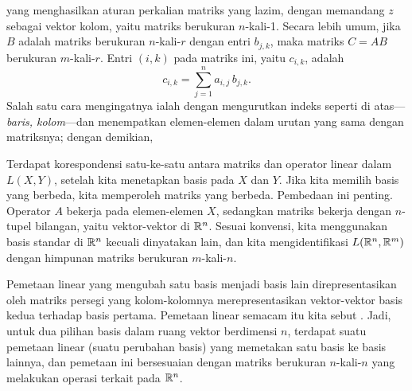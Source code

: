 yang menghasilkan aturan perkalian matriks yang lazim,
dengan memandang $z$ sebagai vektor kolom, yaitu matriks berukuran $n$-kali-1.
%
Secara lebih umum, jika $B$ adalah matriks berukuran $n$-kali-$r$ dengan entri $b_{j,k}$, maka 
matriks $C = AB$ berukuran $m$-kali-$r$. Entri $(i,k)$ pada matriks ini,
yaitu $c_{i,k}$, adalah
\begin{equation*}
c_{i,k} =
\sum_{j=1}^n a_{i,j}\,b_{j,k} .
\end{equation*}
Salah satu cara mengingatnya ialah dengan mengurutkan indeks
seperti di atas---\emph{baris, kolom}---dan
menempatkan elemen-elemen dalam urutan yang sama dengan matriksnya;
dengan demikian,  

Terdapat korespondensi satu-ke-satu antara matriks dan operator linear dalam
$L(X,Y)$, setelah kita menetapkan basis pada $X$ dan $Y$.  Jika kita 
memilih basis yang berbeda, kita memperoleh matriks yang berbeda.
Pembedaan ini penting.
Operator $A$ bekerja pada elemen-elemen $X$, sedangkan matriks
bekerja dengan $n$-tupel bilangan, yaitu vektor-vektor di
${\mathbb{R}}^n$.  Sesuai konvensi, kita menggunakan basis standar di ${\mathbb{R}}^n$ kecuali dinyatakan
lain, dan kita mengidentifikasi $L({\mathbb{R}}^n,{\mathbb{R}}^m)$ dengan himpunan matriks berukuran $m$-kali-$n$.

Pemetaan linear yang mengubah satu basis menjadi basis lain direpresentasikan oleh
matriks persegi yang kolom-kolomnya merepresentasikan vektor-vektor
basis kedua terhadap basis pertama.  Pemetaan linear semacam itu kita
sebut \emph{}.  Jadi, untuk dua pilihan
basis dalam ruang vektor berdimensi $n$, terdapat suatu pemetaan linear
(suatu perubahan basis)
yang memetakan satu basis ke basis lainnya, dan pemetaan ini bersesuaian dengan matriks
berukuran $n$-kali-$n$ yang melakukan operasi terkait pada ${\mathbb{R}}^n$.

\medskip

